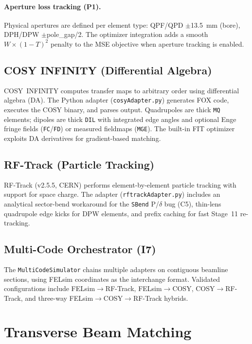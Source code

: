 \documentclass[11pt]{article}
\begin{document}
\paragraph{Aperture loss tracking (P1).}
Physical apertures are defined per element type: QPF/QPD
$\pm$\SI{13.5}{mm} (bore), DPH/DPW $\pm$pole\_gap/2.  The optimizer
integration adds a smooth $W \times (1-T)^2$ penalty to the MSE
objective when aperture tracking is enabled.


\subsection{COSY INFINITY (Differential Algebra)}

COSY~INFINITY computes transfer maps to arbitrary order using
differential algebra (DA).  The Python adapter (\texttt{cosyAdapter.py})
generates FOX code, executes the COSY binary, and parses output.
Quadrupoles are thick \texttt{MQ} elements; dipoles are thick
\texttt{DIL} with integrated edge angles and optional Enge fringe fields
(\texttt{FC}/\texttt{FD}) or measured fieldmaps (\texttt{MGE}).  The
built-in FIT optimizer exploits DA derivatives for gradient-based matching.


\subsection{RF-Track (Particle Tracking)}

RF-Track (v2.5.5, CERN) performs element-by-element particle tracking
with support for space charge.  The adapter (\texttt{rftrackAdapter.py})
includes an analytical sector-bend workaround for the \texttt{SBend}
P/$\delta$ bug (C5), thin-lens quadrupole edge kicks for DPW elements,
and prefix caching for fast Stage~11 re-tracking.


\subsection{Multi-Code Orchestrator (I7)}

The \texttt{MultiCodeSimulator} chains multiple adapters on contiguous
beamline sections, using FELsim coordinates as the interchange format.
Validated configurations include FELsim$\to$RF-Track, FELsim$\to$COSY,
COSY$\to$RF-Track, and three-way FELsim$\to$COSY$\to$RF-Track hybrids.


\section{Transverse Beam Matching}
\label{sec:transverse}
\end{document}
